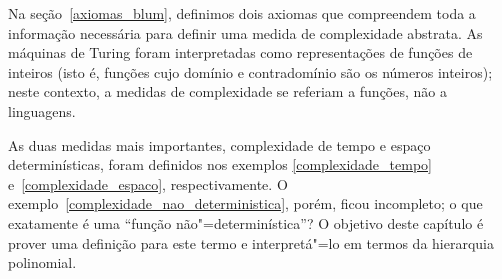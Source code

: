 Na seção~\ref{axiomas_blum},
definimos dois axiomas que compreendem toda a informação necessária
para definir uma medida de complexidade abstrata.
As máquinas de Turing foram interpretadas como
representações de funções de inteiros
(isto é, funções cujo domínio e contradomínio são os números inteiros);
neste contexto,
a medidas de complexidade
se referiam a funções, não a linguagens.

As duas medidas mais importantes,
complexidade de tempo e espaço determinísticas,
foram definidos nos exemplos
\ref{complexidade_tempo} e~\ref{complexidade_espaco},
respectivamente.
O exemplo~\ref{complexidade_nao_deterministica},
porém,
ficou incompleto;
o que exatamente é uma ``função não"=determinística''?
O objetivo deste capítulo é prover uma definição para este termo
e interpretá"=lo em termos da hierarquia polinomial.

